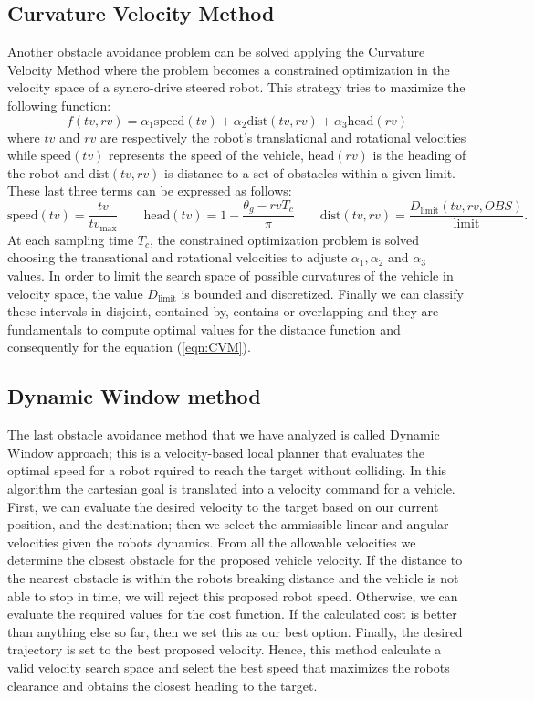 \subsection{Curvature Velocity Method}
Another obstacle avoidance problem can be solved applying the
Curvature Velocity Method where the problem becomes a constrained optimization in the velocity space of a syncro-drive steered robot. This strategy tries to maximize
the following function:
\begin{equation}
\label{eqn:CVM}
	f(tv,rv)=\alpha_1\text{speed}(tv)+\alpha_2\text{dist}(tv,rv)+\alpha_3\text{head}(rv)
\end{equation}
where $tv$ and $rv$ are respectively the robot’s translational and rotational velocities while $\text{speed}(tv)$ represents the speed of the vehicle, $\text{head}(rv)$ is the heading of the robot and $\text{dist}(tv,rv)$ is distance to a set of obstacles within a given limit. These last three terms can be expressed as follows:
\begin{equation}
	\text{speed}(tv) = \frac{tv}{tv_{\text{max}}}\qquad 
	\text{head}(tv) = 1-\frac{\theta_g-rvT_c}{\pi}\qquad
	\text{dist}(tv,rv)=\frac{D_{\text{limit}}(tv,rv,OBS)}{\text{limit}}.
\end{equation}
At each sampling time $T_c$, the constrained optimization problem is solved choosing the transational and rotational velocities to adjuste $\alpha_1,\alpha_2$ and $\alpha_3$ values. In order to limit the search space of possible curvatures of the vehicle in velocity space, the value $D_\text{limit}$ is bounded and discretized. Finally we can classify these intervals in disjoint, contained by, contains or overlapping and they are fundamentals to compute optimal values for the distance function and consequently for the equation (\ref{eqn:CVM}).

\subsection{Dynamic Window method}
The last obstacle avoidance method that we have analyzed is called Dynamic Window approach; this is a velocity-based local planner that evaluates the optimal speed for a robot rquired to reach the target without colliding. In this algorithm the cartesian goal is translated into a velocity command for a vehicle. First, we can evaluate the desired velocity to the target based on our current position, and the destination; then we select the ammissible linear and angular velocities given the robots dynamics. From all the allowable velocities we determine the closest obstacle for the proposed vehicle velocity. If the distance to the nearest obstacle is within the robots breaking distance and the vehicle is not able to stop in time, we will reject this proposed robot speed.
Otherwise, we can evaluate the required values for the cost function. If the calculated cost is better than anything else so far, then we set this as our best option. Finally, the desired trajectory is set to the best proposed velocity.
Hence, this method calculate a valid velocity search space and select the best speed that maximizes the robots clearance and obtains the closest heading to the target.

